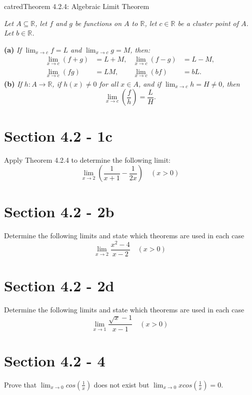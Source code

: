 

\author{Aren Vista}
\date{\today}


\maketitle

\begin{cbox}{catred}{Theorem 4.2.4: Algebraic Limit Theorem}
	\begin{center}
		\textit{Let $A \subseteq \mathbb{R}$, let $f$ and $g$ be functions on $A$ to $\mathbb{R}$, let $c \in \mathbb{R}$ be a cluster point of $A$. Let $b \in \mathbb{R}$.}
	\end{center} \vspace{1em}
	\textbf{(a)} \textit{If $\lim_{x \to c} f = L$ and $\lim_{x \to c} g = M$, then:}
	\begin{align*}
		\lim_{x \to c} (f + g) & = L + M, & \lim_{x \to c} (f - g) & = L - M, \\
		\lim_{x \to c} (fg)    & = LM,    & \lim_{x \to c} (bf)    & = bL.
	\end{align*}
	\textbf{(b)} \textit{If $h : A \to \mathbb{R}$, if $h(x) \neq 0$ for all $x \in A$, and if $\lim_{x \to c} h = H \neq 0$, then}
	\[ \lim_{x \to c} \left( \frac{f}{h} \right) = \frac{L}{H}. \]
\end{cbox}

\section{Section 4.2 - 1c}
Apply Theorem 4.2.4 to determine the following limit:
\[
	\lim_{x \to 2} \left( \frac{1}{x+1} - \frac{1}{2x} \right) \quad (x>0)
\]

\section{Section 4.2 - 2b}
Determine the following limits and state which theorems are used in each case
\[
	\lim_{x \to 2} \frac{x^2-4}{x-2} \quad (x>0)
\]
\section{Section 4.2 - 2d}
Determine the following limits and state which theorems are used in each case
\[
	\lim_{x \to 1} \frac{\sqrt{x}-1}{x-1} \quad (x>0)
\]
\section{Section 4.2 - 4}
Prove that $\lim_{x \to 0} cos(\frac{1}{x})$ does not exist but $\lim_{x \to 0} x cos(\frac{1}{x}) = 0$.
